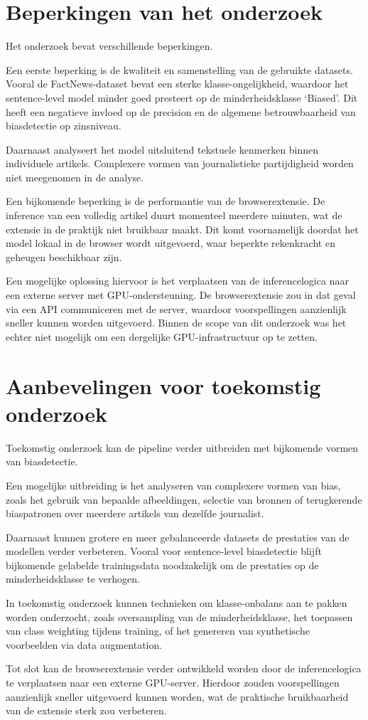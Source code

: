 \section{Beperkingen van het onderzoek}

Het onderzoek bevat verschillende beperkingen.

Een eerste beperking is de kwaliteit en samenstelling van de gebruikte datasets. Vooral de FactNews-dataset bevat een sterke klasse-ongelijkheid, waardoor het sentence-level model minder goed presteert op de minderheidsklasse `Biased'. Dit heeft een negatieve invloed op de precision en de algemene betrouwbaarheid van biasdetectie op zinsniveau.

Daarnaast analyseert het model uitsluitend tekstuele kenmerken binnen individuele artikels. Complexere vormen van journalistieke partijdigheid worden niet meegenomen in de analyse.

Een bijkomende beperking is de performantie van de browserextensie. De inference van een volledig artikel duurt momenteel meerdere minuten, wat de extensie in de praktijk niet bruikbaar maakt. Dit komt voornamelijk doordat het model lokaal in de browser wordt uitgevoerd, waar beperkte rekenkracht en geheugen beschikbaar zijn.

Een mogelijke oplossing hiervoor is het verplaatsen van de inferencelogica naar een externe server met GPU-ondersteuning. De browserextensie zou in dat geval via een API communiceren met de server, waardoor voorspellingen aanzienlijk sneller kunnen worden uitgevoerd. Binnen de scope van dit onderzoek was het echter niet mogelijk om een dergelijke GPU-infrastructuur op te zetten.

\section{Aanbevelingen voor toekomstig onderzoek}

Toekomstig onderzoek kan de pipeline verder uitbreiden met bijkomende vormen van biasdetectie.

Een mogelijke uitbreiding is het analyseren van complexere vormen van bias, zoals het gebruik van bepaalde afbeeldingen, selectie van bronnen of terugkerende biaspatronen over meerdere artikels van dezelfde journalist.

Daarnaast kunnen grotere en meer gebalanceerde datasets de prestaties van de modellen verder verbeteren. Vooral voor sentence-level biasdetectie blijft bijkomende gelabelde trainingsdata noodzakelijk om de prestaties op de minderheidsklasse te verhogen.

In toekomstig onderzoek kunnen technieken om klasse-onbalans aan te pakken worden onderzocht, zoals oversampling van de minderheidsklasse, het toepassen van class weighting tijdens training, of het genereren van synthetische voorbeelden via data augmentation.

Tot slot kan de browserextensie verder ontwikkeld worden door de inferencelogica te verplaatsen naar een externe GPU-server. Hierdoor zouden voorspellingen aanzienlijk sneller uitgevoerd kunnen worden, wat de praktische bruikbaarheid van de extensie sterk zou verbeteren.
